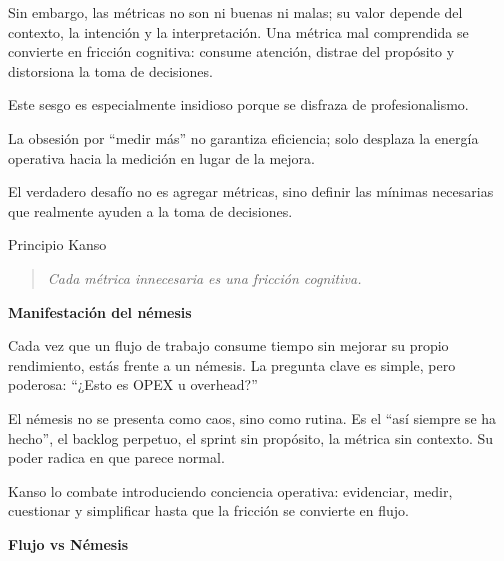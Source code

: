 Sin embargo, las métricas no son ni buenas ni malas; su valor depende del contexto, la intención y la interpretación. Una métrica mal comprendida se convierte en fricción cognitiva: consume atención, distrae del propósito y distorsiona la toma de decisiones.

Este sesgo es especialmente insidioso porque se disfraza de profesionalismo.

La obsesión por ``medir más'' no garantiza eficiencia; solo desplaza la energía operativa hacia la medición en lugar de la mejora.

El verdadero desafío no es agregar métricas, sino definir las mínimas necesarias que realmente ayuden a la toma de decisiones.

Principio Kanso
\begin{quote}
\textit{Cada métrica innecesaria es una fricción cognitiva.}
\end{quote}

\textbf{Manifestación del némesis}

Cada vez que un flujo de trabajo consume tiempo sin mejorar su propio rendimiento, estás frente a un némesis. La pregunta clave es simple, pero poderosa: ``¿Esto es OPEX u overhead?''

El némesis no se presenta como caos, sino como rutina. Es el ``así siempre se ha hecho'', el backlog perpetuo, el sprint sin propósito, la métrica sin contexto. Su poder radica en que parece normal.

Kanso lo combate introduciendo conciencia operativa: evidenciar, medir, cuestionar y simplificar hasta que la fricción se convierte en flujo.

\textbf{Flujo vs Némesis}

